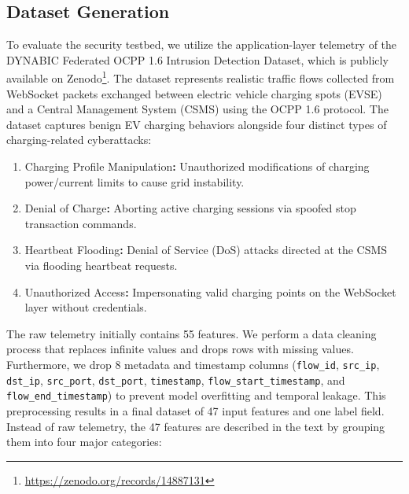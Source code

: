 \documentclass[10pt, a4paper, conference]{IEEEtran}
\begin{document}
\subsection{Dataset Generation}
To evaluate the security testbed, we utilize the application-layer telemetry of the DYNABIC Federated OCPP 1.6 Intrusion Detection Dataset, which is publicly available on Zenodo\footnote{\url{https://zenodo.org/records/14887131}}. The dataset represents realistic traffic flows collected from WebSocket packets exchanged between electric vehicle charging spots (EVSE) and a Central Management System (CSMS) using the OCPP 1.6 protocol. 
The dataset captures benign EV charging behaviors alongside four distinct types of charging-related cyberattacks:
\begin{enumerate}
    \item Charging Profile Manipulation\textbf{:} Unauthorized modifications of charging power/current limits to cause grid instability.
    \item Denial of Charge\textbf{:} Aborting active charging sessions via spoofed stop transaction commands.
    \item Heartbeat Flooding\textbf{:} Denial of Service (DoS) attacks directed at the CSMS via flooding heartbeat requests.
    \item Unauthorized Access\textbf{:} Impersonating valid charging points on the WebSocket layer without credentials.
\end{enumerate}
The raw telemetry initially contains 55 features. We perform a data cleaning process that replaces infinite values and drops rows with missing values. Furthermore, we drop 8 metadata and timestamp columns (\texttt{flow\_id}, \texttt{src\_ip}, \texttt{dst\_ip}, \texttt{src\_port}, \texttt{dst\_port}, \texttt{timestamp}, \texttt{flow\_start\_timestamp}, and \texttt{flow\_end\_timestamp}) to prevent model overfitting and temporal leakage. This preprocessing results in a final dataset of 47 input features and one label field. 
Instead of raw telemetry, the 47 features are described in the text by grouping them into four major categories:
\end{document}
